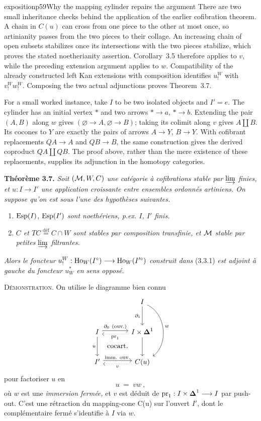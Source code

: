 \begin{dcomment}{exposition}{p59}{Why the mapping cylinder repairs the argument}
There are two small inheritance checks behind the application of the earlier cofibration theorem. A chain in $C(u)$ can cross from one piece to the other at most once, so artinianity passes from the two pieces to their collage. An increasing chain of open subsets stabilizes once its intersections with the two pieces stabilize, which proves the stated noetherianity assertion. Corollary~3.5 therefore applies to $v$, while the preceding extension argument applies to $w$. Compatibility of the already constructed left Kan extensions with composition identifies $u_!^W$ with $v_!^Ww_!^W$. Composing the two actual adjunctions proves Theorem~3.7.

For a small worked instance, take $I$ to be two isolated objects and $I'=e$. The cylinder has an initial vertex $*$ and two arrows $*\to a$, $*\to b$. Extending the pair $(A,B)$ along $w$ gives $(\varnothing\to A,\varnothing\to B)$; taking its colimit along $v$ gives $A\amalg B$. Its cocones to $Y$ are exactly the pairs of arrows $A\to Y$, $B\to Y$. With cofibrant replacements $QA\to A$ and $QB\to B$, the same construction gives the derived coproduct $QA\amalg QB$. The proof above, rather than the mere existence of these replacements, supplies its adjunction in the homotopy categories.
\end{dcomment}


\textbf{Théorème 3.7.} \textit{Soit $(\mathcal{M},W,C)$ une catégorie à cofibrations stable par $\varinjlim$ finies, et $u : I \longrightarrow I'$ une application croissante entre ensembles ordonnés artiniens. On suppose qu'on est sous l'une des hypothèses suivantes.}
\begin{enumerate}
\item[a)] $\operatorname{Esp}(I)$, $\operatorname{Esp}(I')$ \textit{sont noethériens, p.ex. $I$, $I'$ finis.}

\item[b)] \textit{$C$ et $TC \overset{\text{déf}}{=} C\cap W$ sont stables par composition transfinie, et $\mathcal{M}$ stable par petites $\varinjlim$ filtrantes.}
\end{enumerate}
\textit{Alors le foncteur} $u_!^W : \mathrm{Ho}_W(I^\circ) \longrightarrow \mathrm{Ho}_W(I'^\circ)$ \textit{construit dans} (3.3.1) \textit{est adjoint à gauche du foncteur $u_W^*$ en sens opposé.}

\textsc{Démonstration.} On utilise le diagramme bien connu
\[
\begin{tikzcd}[row sep=large, column sep=large]
 & I \arrow[d, "\partial_1"'] \arrow[dd, bend left=60, "w"] \\
I \arrow[r, shift left, "\partial_0\ (\text{ouv.})"] \arrow[d, "u"'] \arrow[dr, phantom, "\text{cocart.}"] & I\times\boldsymbol{\Delta}^1 \arrow[l, dotted, shift left, "\pr_1"] \arrow[d] \\
I' \arrow[r, shift left, "\text{imm. ouv.}"] & C(u) \arrow[l, dotted, shift left, "v"]
\end{tikzcd}
\]
pour factoriser $u$ en
\[
u \;=\; vw\ ,
\]
où $w$ est une \textit{immersion fermée,} et $v$ est déduit de $\mathrm{pr}_1 : I\times\boldsymbol{\Delta}^1 \longrightarrow I$ par push-out. C'est une rétraction du mapping-cone C(u) sur l'ouvert $I'$, dont le complémentaire fermé s'identifie à $I$ via $w$.

